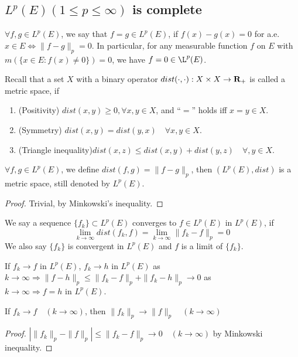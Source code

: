 \documentclass{article}
\begin{document}
\subsection{$L^p(E)(1\leq p\leq \infty)$ is complete}

$\forall f,g\in L^p(E)$, we say that $f=g\in L^p(E)$, if $f(x)-g(x)=0$ for a.e. $x\in E\Leftrightarrow \|f-g\|_{p}=0$. In particular, for any measurable function $f$ on $E$ with $m(\{x\in E:f(x)\neq 0\})=0$, we have $f=0\in \L^p(E)$.

Recall that a set $X$ with a binary operator $dist(\cdot,\cdot):X\times X\to \mathbf{R}_+$ is called a metric space, if 
\begin{enumerate}
\item(Positivity) $dist(x,y)\geq 0,\forall x,y\in X$, and ``$=$'' holds iff $x=y\in X$.
\item(Symmetry) $dist(x,y)=dist(y,x)\quad \forall x,y\in X$.
\item(Triangle inequality)$ dist(x,z)\leq dist (x,y)+dist(y,z)\quad\forall ,y\in X$.
\end{enumerate}

\begin{Thm}
$\forall f,g\in L^p(E)$, we define $dist(f,g)=\|f-g\|_p$, then $(L^p(E),dist)$ is a metric space, still denoted by $L^p(E)$.
\end{Thm}

\begin{proof}Trivial, by Minkowski's inequality.\end{proof}

\begin{Def}
We say a sequence $\{f_k\}\subset L^p(E)$ converges to $f\in L^p(E)$ in $L^p(E)$, if 
\[\lim_{k\to\infty}dist(f_k,f)=\lim_{k\to\infty}\|f_k-f\|_p=0\] 
We also say $\{f_k\}$ is convergent in $L^p(E)$ and $f$ is a limit of $\{f_k\}$.
\end{Def}

\begin{Rmk}[Uniqueness]
If $f_k\to f$ in $L^p(E)$, $f_k\to h$ in $L^p(E)$ as $k\to\infty\Rightarrow \|f-h\|_p\leq \|f_k-f\|_p+\|f_k-h\|_p\to 0$ as $k\to \infty\Rightarrow f=h \text{ in } L^p(E)$.
\end{Rmk}

\begin{Rmk}
If $f_k\to f\quad(k\to \infty)$, then $\|f_k\|_p\to \|f\|_p\quad(k\to\infty)$
\end{Rmk}
\begin{proof}
$|\|f_k\|_p-\|f\|_p|\leq \|f_k-f\|_p\to 0\quad (k\to\infty)$ by Minkowski inequality.
\end{proof}
\end{document}
